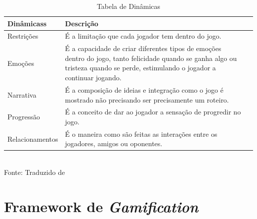 \documentclass[
	12pt,				%
	openany,			%
	oneside,			%
	a4paper,			%
	english,			%
	french,				%
	spanish,			%
	brazil				%
	]{abntex2}
\begin{document}
\begin{table}[H]
\caption{Tabela de Dinâmicas}
\begin{tabularx}{\linewidth}{|p{5cm}|X|l|} \hline
\textbf{Dinâmicass} & \textbf{Descrição} \\ \hline

Restrições & É a limitação que cada jogador tem dentro do jogo. \\ \hline
Emoções & É a capacidade de criar diferentes tipos de emoções dentro do jogo, tanto felicidade quando se ganha algo ou tristeza quando se perde, estimulando o jogador a continuar jogando. \\ \hline
Narrativa & É a composição de ideias e integração como o jogo é mostrado não precisando ser precisamente um roteiro. \\ \hline
Progressão & É a conceito de dar ao jogador a sensação de progredir no jogo. \\ \hline 
Relacionamentos & É o maneira como são feitas as interações entre os jogadores, amigos ou oponentes. \\ \hline 


\end{tabularx}
\\

Fonte: Traduzido de 
\label{Tab:larguracolunas}
\end{table}

\section{Framework de \textit{Gamification}}
\end{document}
